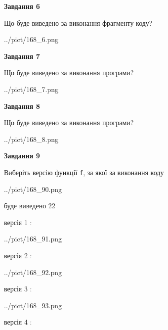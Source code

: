 \documentclass[12pt, ukrainian]{article}
\def\code#1{\Verb!#1!}
\begin{document}
{\begin {large}
{\begin {center}\textbf{Завдання 6}\end {center}}

Що буде виведено за виконання фрагменту коду?\par
\begin{center}
	{../pict/168_6.png}
\end{center}
\newpage

{\begin {center}\textbf{Завдання 7}\end {center}}

Що буде виведено за виконання програми?\par
\begin{center}
	{../pict/168_7.png}
\end{center}
\newpage

{\begin {center}\textbf{Завдання 8}\end {center}}

Що буде виведено за виконання програми?\par
\begin{center}
	{../pict/168_8.png}
\end{center}
\newpage

{\begin {center}\textbf{Завдання 9}\end {center}}

Виберіть версію функції \code{f}, за якої за виконання коду
\begin{center}
	{../pict/168_90.png}
\end{center}
буде виведено 22

\vspace{5mm}
версія 1 :

\begin{center}
	{../pict/168_91.png}
\end{center}
версія 2 :

\begin{center}
	{../pict/168_92.png}
\end{center}
версія 3 :

\begin{center}
	{../pict/168_93.png}
\end{center}
версія 4 :


\end{large}}
\end{document}
